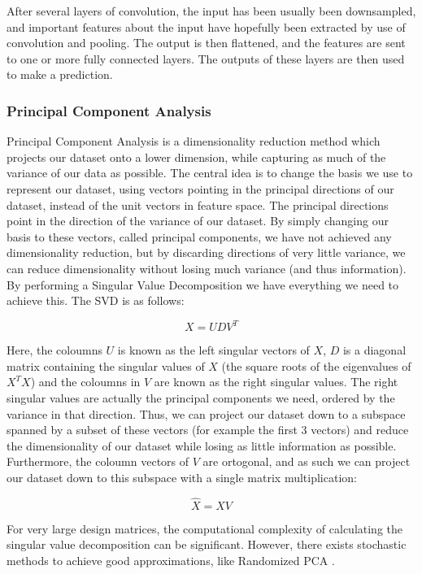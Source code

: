 \documentclass[onecolumn,10pt,cleanfoot]{asme2ej}
\begin{document}
After several layers of convolution, the input has been usually been downsampled, and important features about the input have hopefully been extracted by use of convolution and pooling. The output is then flattened, and the features are sent to one or more fully connected layers. The outputs of these layers are then used to make a prediction.


\subsubsection{Principal Component Analysis}

Principal Component Analysis is a dimensionality reduction method which projects our dataset onto a lower dimension, while capturing as much of the variance of our data as possible. The central idea is to change the basis we use to represent our dataset, using vectors pointing in the principal directions of our dataset, instead of the unit vectors in feature space. The principal directions point in the direction of the variance of our dataset. By simply changing our basis to these vectors, called principal components, we have not achieved any dimensionality reduction, but by discarding directions of very little variance, we can reduce dimensionality without losing much variance (and thus information). By performing a Singular Value Decomposition we have everything we need to achieve this. The SVD is as follows:

\begin{equation}
X = UDV^T
\end{equation}

Here, the coloumns $U$ is known as the left singular vectors of $X$, $D$ is a diagonal matrix containing the singular values of $X$ (the square roots of the eigenvalues of $X^TX$) and the coloumns in $V$ are known as the right singular values. The right singular values are actually the principal components we need, ordered by the variance in that direction. Thus, we can project our dataset down to a subspace spanned by a subset of these vectors (for example the first 3 vectors) and reduce the dimensionality of our dataset while losing as little information as possible. Furthermore, the coloumn vectors of $V$ are ortogonal, and as such we can project our dataset down to this subspace with a single matrix multiplication:

\begin{equation}
\hat{X} = XV
\end{equation}

For very large design matrices, the computational complexity of calculating the singular value decomposition can be significant. However, there exists stochastic methods to achieve good approximations, like Randomized PCA \cite[227]{halko}.
\end{document}

